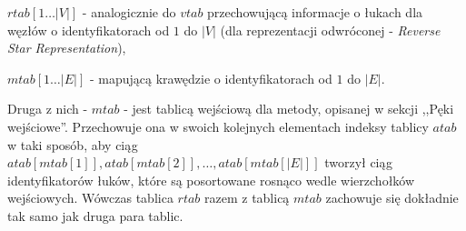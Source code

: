 \begin{myitemize}
	\item $rtab \left[ 1 \ldots \left| V \right| \right] $ - analogicznie do $vtab$ przechowującą informacje o łukach dla węzłów o identyfikatorach od $1$ do $ \left| V \right| $ (dla reprezentacji odwróconej - \textit{Reverse Star Representation}),
	\item $mtab \left[ 1 \ldots \left| E \right| \right] $ - mapującą krawędzie o identyfikatorach od $1$ do $ \left| E \right| $.
\end{myitemize}

Druga z nich - $mtab$ - jest tablicą wejściową dla metody, opisanej w sekcji ,,Pęki wejściowe''. Przechowuje ona w swoich kolejnych elementach indeksy tablicy $atab$ w taki sposób, aby ciąg \\ $atab \left[ mtab \left[ 1 \right] \right], atab \left[ mtab \left[ 2 \right] \right], \ldots, atab \left[ mtab \left[ \left| E \right| \right] \right] $ tworzył ciąg identyfikatorów łuków, które są posortowane rosnąco wedle wierzchołków wejściowych. Wówczas tablica $rtab$ razem z tablicą $mtab$ zachowuje się dokładnie tak samo jak druga para tablic.

